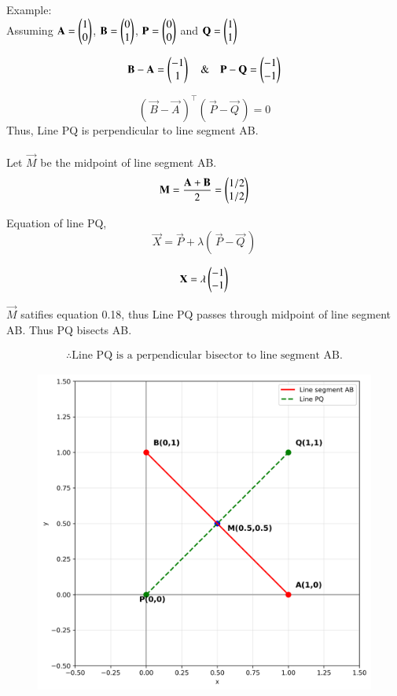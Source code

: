 \documentclass[journal]{IEEEtran}
\begin{document}
\bigskip
Example:\\
Assuming $\mathbf{A} = \begin{pmatrix}1 \\ 0\end{pmatrix}$, $\mathbf{B} = \begin{pmatrix}0 \\ 1\end{pmatrix}$, $\mathbf{P} = \begin{pmatrix}0 \\ 0\end{pmatrix}$ and $\mathbf{Q} = \begin{pmatrix}1 \\ 1\end{pmatrix}$

\begin{equation}
    \mathbf{B} - \mathbf{A} = \begin{pmatrix}-1 \\ 1\end{pmatrix} \quad \& \quad \mathbf{P} - \mathbf{Q} = \begin{pmatrix}-1 \\ -1\end{pmatrix} 
\end{equation}


\begin{equation}
    (\, \vec{B} - \vec{A} \,)^\top(\, \vec{P} - \vec{Q} \,) = 0
\end{equation}
Thus, Line PQ is perpendicular to line segment AB.\\\\

Let $\vec{M}$ be the midpoint of line segment AB.
\begin{equation}
    \mathbf{M} = \dfrac{\mathbf{A}+\mathbf{B}}{2} = \begin{pmatrix}1/2 \\ 1/2\end{pmatrix}
\end{equation}

Equation of line PQ,
\begin{equation}
    \vec{X} = \vec{P} + \lambda(\, \vec{P}-\vec{Q} \,)
\end{equation}

\begin{equation}
    \mathbf{X} = \lambda\begin{pmatrix}-1 \\ -1\end{pmatrix}
\end{equation}

$\vec{M}$ satifies equation 0.18, thus Line PQ passes through midpoint of line segment AB. Thus PQ bisects AB.

\begin{align*}
\therefore \text{Line PQ is a perpendicular bisector to line segment AB.}
\end{align*}


\begin{figure}[htbp]
    \centering
\includegraphics[width=\columnwidth]{figs/fig1.png}
    \caption{}
    \label{fig:figs/fig1.png}
\end{figure}
\end{document}
